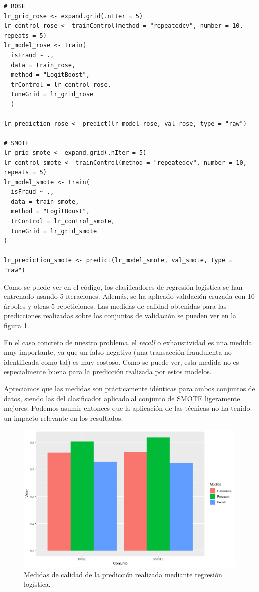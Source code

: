 \begin{lstlisting}
# ROSE
lr_grid_rose <- expand.grid(.nIter = 5)
lr_control_rose <- trainControl(method = "repeatedcv", number = 10, repeats = 5)
lr_model_rose <- train(
  isFraud ~ .,
  data = train_rose,
  method = "LogitBoost",
  trControl = lr_control_rose,
  tuneGrid = lr_grid_rose
  )

lr_prediction_rose <- predict(lr_model_rose, val_rose, type = "raw")

# SMOTE
lr_grid_smote <- expand.grid(.nIter = 5)
lr_control_smote <- trainControl(method = "repeatedcv", number = 10, repeats = 5)
lr_model_smote <- train(
  isFraud ~ .,
  data = train_smote,
  method = "LogitBoost",
  trControl = lr_control_smote,
  tuneGrid = lr_grid_smote
)

lr_prediction_smote <- predict(lr_model_smote, val_smote, type = "raw")
\end{lstlisting}

Como se puede ver en el código, los clasificadores de regresión loǵistica se han
entrenado usando 5 iteraciones. Además, se ha aplicado validación cruzada con 10
árboles y otras 5 repeticiones. Las medidas de calidad obtenidas para las
predicciones realizadas sobre los conjuntos de validación se pueden ver en la
figura \ref{fig:lr-barplot}.

En el caso concreto de nuestro problema, el \textit{recall} o exhaustividad es
una medida muy importante, ya que un falso negativo (una transacción fraudulenta
no identificada como tal) es muy costoso. Como se puede ver, esta medida no es
especialmente buena para la predicción realizada por estos modelos.

Apreciamos que las medidas son prácticamente idénticas para ambos conjuntos de
datos, siendo las del clasificador aplicado al conjunto de SMOTE ligeramente
mejores. Podemos asumir entonces que la aplicación de las técnicas no ha tenido
un impacto relevante en los resultados.

\begin{figure}
    \includegraphics[width=\textwidth]{images/classification/lr-barplot.png}
    \caption{Medidas de calidad de la predicción realizada mediante regresión logística.}
    \label{fig:lr-barplot}
\end{figure}


